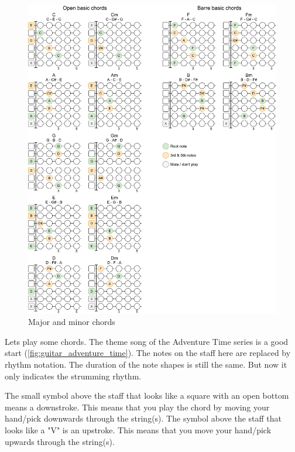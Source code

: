 \begin{figure}[h]
	\centering
	\includegraphics[height=0.8\textheight]{../../Images/GuitarBasicChords.png}
	\caption{Major and minor chords}
	\label{fig:guitar_major_minor_chords}
\end{figure}

\clearpage

Lets play some chords. The theme song of the Adventure Time series is a good start (\autoref{fig:guitar_adventure_time}). The notes on the staff here are replaced by rhythm notation. The duration of the note shapes is still the same. But now it only indicates the strumming rhythm.

The small symbol above the staff that looks like a square with an open bottom means a downstroke. This means that you play the chord by moving your hand/pick downwards through the string(s). The symbol above the staff that looks like a "V" is an upstroke. This means that you move your hand/pick upwards through the string(s).


